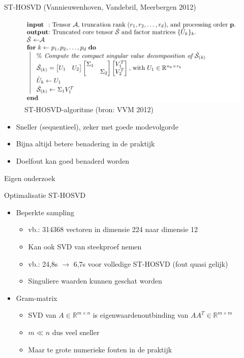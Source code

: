 \documentclass[t,12pt,dutch
\ifx\beamermode\undefined\else,\beamermode\fi
]{beamer}
\begin{document}
\begin{frame}{ST-HOSVD (Vannieuwenhoven, Vandebril, Meerbergen 2012)}

\begin{figure}[H]
\centering
\includegraphics[scale=0.25]{images/ST-HOSVD.png}
\caption{ST-HOSVD-algoritme (bron: VVM 2012)}
\end{figure}

\begin{itemize}
\item Sneller (sequentieel), zeker met goede modevolgorde
\item Bijna altijd betere benadering in de praktijk
\item Doelfout kan goed benaderd worden
\end{itemize}

\end{frame}

\begin{frame}{}
\begin{center}
\vspace*{\fill}
\vspace*{\fill}
\Huge
Eigen onderzoek
\normalsize
\vspace*{\fill}
\end{center}
\end{frame}

\begin{frame}{Optimalisatie ST-HOSVD}

\begin{itemize}
\item Beperkte sampling
\begin{itemize}
\item vb.: 314368 vectoren in dimensie 224 naar dimensie 12
\item Kan ook SVD van steekproef nemen
\item vb.: 24,8s $\rightarrow$ 6,7s voor volledige ST-HOSVD (fout quasi gelijk)
\item Singuliere waarden kunnen geschat worden
\end{itemize}
\item Gram-matrix
\begin{itemize}
\item SVD van $A \in \mathbb{R}^{m \times n}$ is eigenwaardenontbinding van $AA^T \in \mathbb{R}^{m \times m}$
\item $m \ll n$ dus veel sneller
\item Maar te grote numerieke fouten in de praktijk
\end{itemize}
\end{itemize}

\end{frame}
\end{document}

